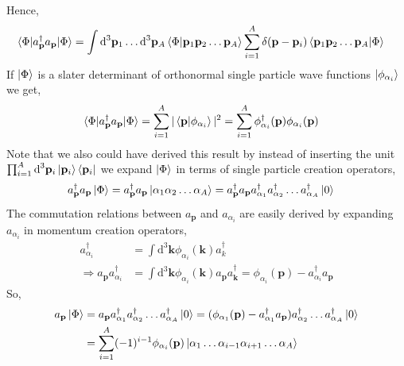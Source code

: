 \documentclass[10pt]{article}
\begin{document}
Hence,
\begin{align}
	\braket{ \Phi | a_{\mathbf{p}}^{\dagger} a_{\mathbf{p}} | \Phi} &= \int \textrm{d}^{3} \mathbf{p}_{1} \ldots \textrm{d}^{3} \mathbf{p}_{A} \braket {\Phi | \mathbf{p}_1 \mathbf{p}_2 \ldots \mathbf{p}_{A}} \sum_{i=1}^{A} \delta(\mathbf{p} - \mathbf{p}_{i}) \braket{ \mathbf{p}_{1} \mathbf{p}_{2} \ldots \mathbf{p}_{A} | \Phi}
\end{align}
If $\ket{\Phi}$ is a slater determinant of orthonormal single particle wave functions $\ket{\phi_{\alpha_{i}}}$ we get,
\begin{align}
	\braket{ \Phi | a_{\mathbf{p}}^{\dagger} a_{\mathbf{p}} | \Phi} &= \sum_{i=1}^{A} | \braket{ \mathbf{p} | \phi_{\alpha_{i}} } |^{2} = \sum_{i=1}^{A} \phi_{\alpha_i}^{\dagger}(\mathbf{p}) \phi_{\alpha_i}(\mathbf{p})
\end{align}
Note that we also could have derived this result by instead of inserting the unit $\prod_{i=1}^{A} \textrm{d}^{3} \mathbf{p}_{i} \ket{\mathbf{p}_{i}}\bra{\mathbf{p}_{i}}$ we expand $\ket{\Phi}$ in terms of single particle creation operators,
\begin{align}
	a_{\mathbf{p}}^{\dagger} a_{\mathbf{p}} \ket{\Phi} &= a_{\mathbf{p}}^{\dagger} a_{\mathbf{p}} \ket{ \alpha_1 \alpha_2 \ldots \alpha_A } = a_{\mathbf{p}}^{\dagger} a_{\mathbf{p}} a_{\alpha_1}^{\dagger} a_{\alpha_2}^{\dagger} \ldots a_{\alpha_A}^{\dagger} \ket{0}
\end{align}
The commutation relations between $a_{\mathbf{p}}$ and $a_{\alpha_i}$ are easily derived by expanding $a_{\alpha_i}$ in momentum creation operators,
\begin{align}
	a_{\alpha_i}^{\dagger} &= \int \textrm{d}^{3} \mathbf{k} \phi_{\alpha_i}(\mathbf{k}) a_{k}^{\dagger} \\
	\Rightarrow a_{\mathbf{p}} a_{\alpha_i}^{\dagger} &= \int \textrm{d}^{3} \mathbf{k} \phi_{\alpha_i}(\mathbf{k}) a_{\mathbf{p}} a_{\mathbf{k}}^{\dagger} = \phi_{\alpha_i}(\mathbf{p}) - a_{\alpha_i}^{\dagger} a_{\mathbf{p}}
\end{align}
So,
\begin{align}
	a_{\mathbf{p}} \ket{\Phi} &= a_{\mathbf{p}} a_{\alpha_1}^{\dagger} a_{\alpha_2}^{\dagger} \ldots a_{\alpha_A}^{\dagger} \ket{0} = (\phi_{\alpha_1}(\mathbf{p}) - a_{\alpha_1}^{\dagger} a_{\mathbf{p}}) a_{\alpha_2}^{\dagger} \ldots a_{\alpha_A}^{\dagger} \ket{0} \\
	&= \sum_{i=1}^{A} (-1)^{i-1} \phi_{\alpha_{i}}(\mathbf{p}) \ket{ \alpha_1 \ldots \alpha_{i-1} \alpha_{i+1} \ldots \alpha_A}
\end{align}
\end{document}

